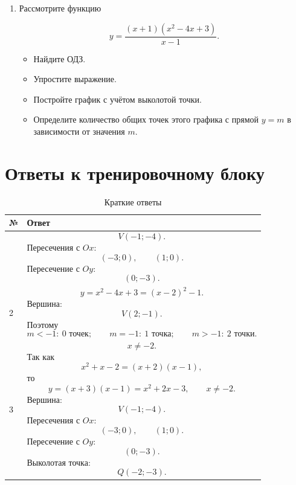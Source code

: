 \documentclass[a4paper,12pt]{article}
\begin{document}
\begin{enumerate}[label=\textbf{\arabic*.}]
После построения найдите все значения \(m\), при которых прямая

\[
y=m
\]

имеет с графиком ровно одну общую точку.

\vspace{5mm}

\item
Рассмотрите функцию

\[
y=
\frac{(x+1)(x^2-4x+3)}{x-1}.
\]

\begin{itemize}
  \item Найдите ОДЗ.
  \item Упростите выражение.
  \item Постройте график с учётом выколотой точки.
  \item Определите количество общих точек этого графика
  с прямой \(y=m\) в зависимости от значения \(m\).
\end{itemize}

\end{enumerate}

\clearpage

\section*{Ответы к тренировочному блоку}

\renewcommand{\arraystretch}{1.35}

\begin{table}[ht]
\centering
\caption{Краткие ответы}
\begin{tabularx}{\linewidth}{
  >{\raggedright\arraybackslash}p{10mm}
  >{\raggedright\arraybackslash}X
}
\toprule
\textbf{№} & \textbf{Ответ} \\
\midrule

1 &
\[
V(-1;-4).
\]
Пересечения с \(Ox\):
\[
(-3;0),\qquad(1;0).
\]
Пересечение с \(Oy\):
\[
(0;-3).
\]
\\

\midrule

2 &
\[
y=x^2-4x+3=(x-2)^2-1.
\]
Вершина:
\[
V(2;-1).
\]
Поэтому
\[
m<-1:\ 0\text{ точек};
\qquad
m=-1:\ 1\text{ точка};
\qquad
m>-1:\ 2\text{ точки}.
\]
\\

\midrule

3 &
\[
x\ne-2.
\]
Так как
\[
x^2+x-2=(x+2)(x-1),
\]
то
\[
y=(x+3)(x-1)=x^2+2x-3,
\qquad x\ne-2.
\]
Вершина:
\[
V(-1;-4).
\]
Пересечения с \(Ox\):
\[
(-3;0),\qquad(1;0).
\]
Пересечение с \(Oy\):
\[
(0;-3).
\]
Выколотая точка:
\[
Q(-2;-3).
\]
\\

\bottomrule
\end{tabularx}
\end{table}
\end{document}
